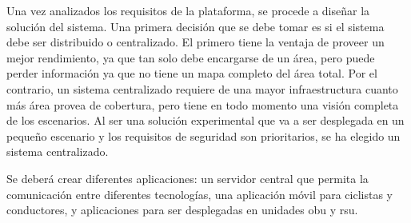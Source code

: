Una vez analizados los requisitos de la plataforma, se procede a diseñar la solución del sistema. Una primera
decisión que se debe tomar es si el sistema debe ser distribuido o centralizado. El primero tiene la ventaja de
proveer un mejor rendimiento, ya que tan solo debe encargarse de un área, pero puede perder información
ya que no tiene un mapa completo del área total. Por el contrario, un sistema centralizado requiere de una 
mayor infraestructura cuanto más área provea de cobertura, pero tiene en todo momento una visión completa
de los escenarios. Al ser una solución experimental que va a ser desplegada en un pequeño escenario y los
requisitos de seguridad son prioritarios, se ha elegido un sistema centralizado.

Se deberá crear diferentes aplicaciones: un servidor central que permita la comunicación entre diferentes
tecnologías, una aplicación móvil para ciclistas y conductores, y aplicaciones para ser desplegadas en
unidades \gls{obu} y \gls{rsu}.






